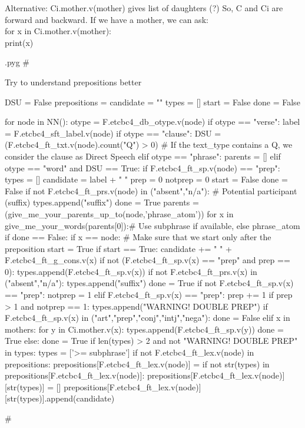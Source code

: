\documentclass{report}
\makeatletter
\newenvironment{python}{%
  \VerbatimEnvironment
  \minted@resetoptions
  \setkeys{minted@opt}{}
      \begin{VerbatimOut}{\jobname.pyg}}
{%
      \end{VerbatimOut}
      \minted@pygmentize{python}
      \DeleteFile{\jobname.pyg}}
\makeatother
\begin{document}
Alternative: Ci.mother.v(mother) gives list of daughters (?)
So, C and Ci are forward and backward.
If we have a mother, we can ask: \\
  for x in Ci.mother.v(mother): \\
    print(x)

\begin{python}
#{{{ Try to understand prepositions better

DSU = False
prepositions = {}
candidate = ""
types = []
start = False
done = False

for node in NN():
    otype = F.etcbc4_db_otype.v(node)
    if otype == "verse":
        label = F.etcbc4_sft_label.v(node)
    if otype == "clause":
        DSU = (F.etcbc4_ft_txt.v(node).count("Q") > 0)    # If the text_type contains a Q, we consider the clause as Direct Speech
    elif otype == "phrase":
        parents = []
    elif otype == "word" and DSU == True:
        if F.etcbc4_ft_sp.v(node) == "prep":
            types = []
            candidate = label + " "
            prep = 0
            notprep = 0
            start = False
            done = False
            if not F.etcbc4_ft_prs.v(node) in ("absent","n/a"):    # Potential participant (suffix)
                types.append("suffix")
                done = True
            parents = (give_me_your_parents_up_to(node,'phrase_atom'))
            for x in give_me_your_words(parents[0]):# Use subphrase if available, else phrase_atom
                if done == False:
                    if x == node:   # Make sure that we start only after the preposition
                        start = True
                    if start == True:
                        candidate += " " + F.etcbc4_ft_g_cons.v(x)
                        if not (F.etcbc4_ft_sp.v(x) == "prep" and prep == 0):
                            types.append(F.etcbc4_ft_sp.v(x)) 
                        if not F.etcbc4_ft_prs.v(x) in ("absent","n/a"):
                            types.append("suffix")
                            done = True
                        if not F.etcbc4_ft_sp.v(x) == "prep":
                            notprep = 1
                        elif F.etcbc4_ft_sp.v(x) == "prep":
                            prep += 1
                            if prep > 1 and notprep == 1:
                                types.append("WARNING! DOUBLE PREP")
                        if F.etcbc4_ft_sp.v(x) in ("art","prep","conj","intj","nega"):
                            done = False
                        elif x in mothers:
                            for y in Ci.mother.v(x):
                                types.append(F.etcbc4_ft_sp.v(y))
                            done = True
                        else:
                            done = True
            if len(types) > 2 and not "WARNING! DOUBLE PREP" in types:
                types = ['>= subphrase']
            if not F.etcbc4_ft_lex.v(node) in prepositions:
                prepositions[F.etcbc4_ft_lex.v(node)] = {}
            if not str(types) in prepositions[F.etcbc4_ft_lex.v(node)]:
                prepositions[F.etcbc4_ft_lex.v(node)][str(types)] = []
            prepositions[F.etcbc4_ft_lex.v(node)][str(types)].append(candidate)

#}}}
\end{python}
\end{document}
